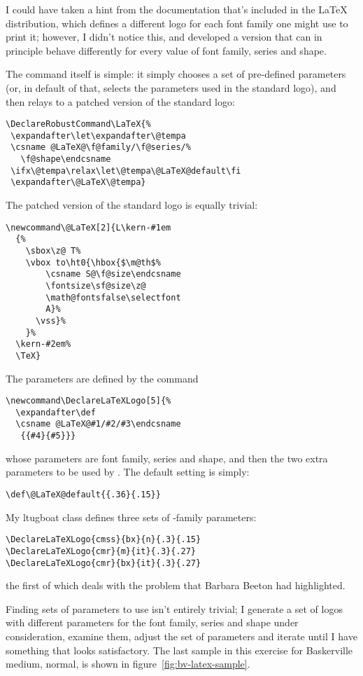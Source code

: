 \begin{Article}
  I could have taken a hint from the documentation that's included in
  the \LaTeX{} distribution, which defines a different logo for each
  font family one might use to print it; however, I didn't notice
  this, and developed a version that can in principle behave
  differently for every value of font family, series and shape.

  The  command itself is simple: it simply chooses a set of
  pre-defined parameters (or, in default of that, selects the
  parameters used in the standard logo), and then relays to a patched
  version of the standard logo:
\begin{verbatim}
\DeclareRobustCommand\LaTeX{%
 \expandafter\let\expandafter\@tempa
 \csname @LaTeX@\f@family/\f@series/%
   \f@shape\endcsname
 \ifx\@tempa\relax\let\@tempa\@LaTeX@default\fi
 \expandafter\@LaTeX\@tempa}
\end{verbatim}
  The patched version of the standard logo is equally trivial:
\begin{verbatim}
\newcommand\@LaTeX[2]{L\kern-#1em
  {%
    \sbox\z@ T%
    \vbox to\ht0{\hbox{$\m@th$%
        \csname S@\f@size\endcsname
        \fontsize\sf@size\z@
        \math@fontsfalse\selectfont
        A}%
      \vss}%
    }%
  \kern-#2em%
  \TeX}
\end{verbatim}
  The parameters are defined by the command
\begin{verbatim}
\newcommand\DeclareLaTeXLogo[5]{%
  \expandafter\def
  \csname @LaTeX@#1/#2/#3\endcsname
   {{#4}{#5}}}
\end{verbatim}
  whose parameters are font family, series and shape, and then the two
  extra parameters to be used by .  The default setting is
  simply:
\begin{verbatim}
\def\@LaTeX@default{{.36}{.15}}
\end{verbatim}
  My \textsf{ltugboat} class defines three sets of -family
  parameters:
\begin{verbatim}
\DeclareLaTeXLogo{cmss}{bx}{n}{.3}{.15}
\DeclareLaTeXLogo{cmr}{m}{it}{.3}{.27}
\DeclareLaTeXLogo{cmr}{bx}{it}{.3}{.27}
\end{verbatim}
  the first of which deals with the problem that Barbara Beeton had
  highlighted.

  Finding sets of parameters to use isn't entirely trivial; I generate
  a set of logos with different parameters for the font family, series
  and shape under consideration, examine them, adjust the set of
  parameters and iterate until I have something that looks
  satisfactory.  The last sample in this exercise for Baskerville
  medium, normal, is shown in figure~\ref{fig:bv-latex-sample}.


\end{Article}
